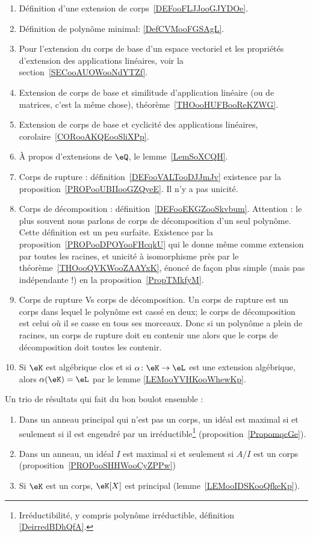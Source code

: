  \label{THEMEooZYKFooQXhiPD}
\begin{enumerate}
	\item
	      Définition d'une extension de corps~\ref{DEFooFLJJooGJYDOe}.
	\item
	      Définition de polynôme minimal: \ref{DefCVMooFGSAgL}.
	\item
	      Pour l'extension du corps de base d'un espace vectoriel et les propriétés d'extension des applications linéaires, voir la section~\ref{SECooAUOWooNdYTZf}.
	\item
	      Extension de corps de base et similitude d'application linéaire (ou de matrices, c'est la même chose), théorème~\ref{THOooHUFBooReKZWG}.
	\item
	      Extension de corps de base et cyclicité des applications linéaires, corolaire~\ref{CORooAKQEooSliXPp}.
	\item
	      À propos d'extensions de \( \eQ\), le lemme~\ref{LemSoXCQH}.
	\item
	      Corps de rupture : définition~\ref{DEFooVALTooDJJmJv} existence par la proposition~\ref{PROPooUBIIooGZQyeE}. Il n'y a pas unicité.
	\item
	      Corps de décomposition : définition~\ref{DEFooEKGZooSkvbum}. Attention : le plus souvent nous parlons de corps de décomposition d'un seul polynôme. Cette définition est un peu surfaite. Existence par la proposition~\ref{PROPooDPOYooFHcqkU} qui le donne même comme extension par toutes les racines, et unicité à isomorphisme près par le théorème~\ref{THOooQVKWooZAAYxK}, énoncé de façon plus simple (mais pas indépendante !) en la proposition~\ref{PropTMkfyM}.
	\item
	      Corps de rupture Vs corps de décomposition. Un corps de rupture est un corps dans lequel le polynôme est cassé en deux; le corps de décomposition est celui où il se casse en tous ses morceaux. Donc si un polynôme a plein de racines, un corps de rupture doit en contenir une alors que le corps de décomposition doit toutes les contenir.
	\item
	      Si \( \eK\) est algébrique clos et si \( \alpha\colon \eK\to \eL\) est une extension algébrique, alors \( \alpha(\eK)=\eL\) par le lemme \ref{LEMooYVHKooWhewKp}.
\end{enumerate}

Un trio de résultats qui fait du bon boulot ensemble :
\begin{enumerate}
	\item
	      Dans un anneau principal qui n'est pas un corps, un idéal est maximal si et seulement si il est engendré par un irréductible\footnote{Irréductibilité, y compris polynôme irréductible, définition \ref{DeirredBDhQfA}.} (proposition~\ref{PropomqcGe}).
	\item
	      Dans un anneau, un idéal \( I\) est maximal si et seulement si \( A/I\) est un corps (proposition~\ref{PROPooSHHWooCyZPPw})
	\item
	      Si \( \eK\) est un corps, \( \eK[X]\) est principal (lemme~\ref{LEMooIDSKooQfkeKp}).
\end{enumerate}
